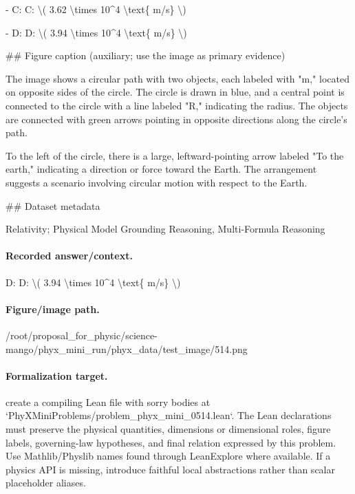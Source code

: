 - C: C: \textbackslash{}( 3.62 \textbackslash{}times 10\textasciicircum{}4 \textbackslash{}text\{ m/s\} \textbackslash{})

- D: D: \textbackslash{}( 3.94 \textbackslash{}times 10\textasciicircum{}4 \textbackslash{}text\{ m/s\} \textbackslash{})

\#\# Figure caption (auxiliary; use the image as primary evidence)

The image shows a circular path with two objects, each labeled with "m," located on opposite sides of the circle. The circle is drawn in blue, and a central point is connected to the circle with a line labeled "R," indicating the radius. The objects are connected with green arrows pointing in opposite directions along the circle's path.

To the left of the circle, there is a large, leftward-pointing arrow labeled "To the earth," indicating a direction or force toward the Earth. The arrangement suggests a scenario involving circular motion with respect to the Earth.

\#\# Dataset metadata

Relativity; Physical Model Grounding Reasoning, Multi-Formula Reasoning

\paragraph{Recorded answer/context.}
D: D: \textbackslash{}( 3.94 \textbackslash{}times 10\textasciicircum{}4 \textbackslash{}text\{ m/s\} \textbackslash{})

\paragraph{Figure/image path.}
/root/proposal\_for\_physic/science-mango/phyx\_mini\_run/phyx\_data/test\_image/514.png

\paragraph{Formalization target.}
create a compiling Lean file with sorry bodies at `PhyXMiniProblems/problem\_phyx\_mini\_0514.lean`. The Lean declarations must preserve the physical quantities, dimensions or dimensional roles, figure labels, governing-law hypotheses, and final relation expressed by this problem.
Use Mathlib/Physlib names found through LeanExplore where available. If a physics API is missing, introduce faithful local abstractions rather than scalar placeholder aliases.

